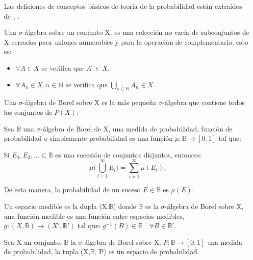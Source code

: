 \documentclass[../proyecto.tex]{memoir}
\begin{document}
 
Las deficiones de conceptos básicos de teoría de la probabilidad están extraídos de \cite{proman}, \cite{}. 

\begin{defi}

Una $\sigma$-álgebra sobre un conjunto X, es una colección no vacía de subconjuntos de X cerrados para uniones numerables y para la operación de complementario, esto es:
\begin{itemize}
\item $\forall A \in X$ se verifica que $A^{c} \in X$.
\item $ \forall A_{n} \in X, n \in \mathds{N} $ se verifica que $\bigcup _{n \in \mathds{N}} A_{n} \in X$.
\end{itemize}

\end{defi}

\begin{defi}
Una $\sigma$-álgebra de Borel sobre X es la más pequeña $\sigma$-álgebra que contiene todos los conjuntos de $P(X)$. 
\end{defi}

\begin{defi}
Sea $\mathds{B}$ una $\sigma$-álgebra de Borel de X, una medida de probabilidad, función de probabilidad o simplemente probabilidad es una función $\mu: \mathds{B} \rightarrow [0,1] $ tal que: 

Si $E_{1}, E_{2},... \subset \mathds{B}$ es una sucesión de conjuntos disjuntos, entonces:
\begin{equation*}
 \mu \big( \bigcup _{i=1} ^{\infty} E_{i} \big) = \sum _{i=1}^{\infty} \mu ( E_{i} ).
\end{equation*}
\end{defi}

De esta manera, la probabilidad de un suceso $E \in \mathds{B}$ es $\mu(E)$.

\begin{defi}
Un espacio medible es la dupla (X,$\mathds{B}$) donde $\mathds{B}$ es la $\sigma$-álgebra de Borel sobre X, una función medible es una función entre espacios medibles, $g:  (X,\mathds{B}) \rightarrow (X',\mathds{B}')$ tal que: $g^{-1}(B) \in \mathds{B} \quad \forall B \in \mathds{B}'$.
\end{defi}

\begin{defi}
Sea X un conjunto, $\mathds{B}$ la $\sigma$-álgebra de Borel sobre X, $P: \mathds{B} \rightarrow [0,1] $ una medida de probabilidad, la tupla (X,$\mathds{B}$, P) es un espacio de probabilidad. 
\end{defi}
\end{document}

